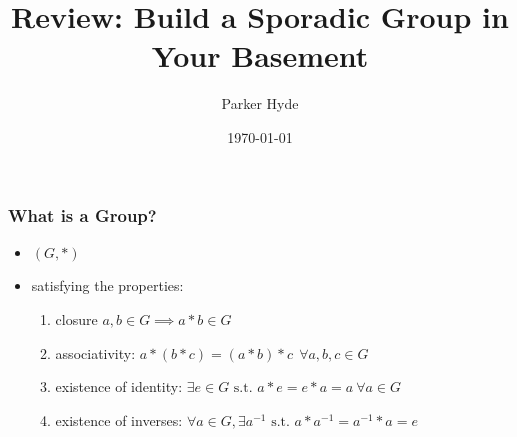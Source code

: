 \documentclass{beamer}
\title{Review: Build a Sporadic Group in Your Basement}
\author{Parker Hyde}
\institute{Georgia State University}
\date{\today}
\begin{document}
\frame{\titlepage}

\begin{frame}
    \frametitle{What is a Group?}
    \begin{itemize}
        \item<2-> \( (G, *) \)
        \item<3->satisfying the properties:
            \begin{enumerate}
                \item closure \( a, b \in G \implies a * b \in G \)
                \item associativity: \(  a * (b * c) = (a * b) * c \ \ \forall a,b,c \in G \) 
                \item existence of identity: \( \exists e \in G \text{ s.t. } a*e = e*a = a \ \forall a \in G \) 
                \item existence of inverses: \( \forall a \in G,  \exists a^{-1} \text { s.t. } a * a^{-1} = a^{-1} * a = e\) 
            \end{enumerate}
    \end{itemize}
\end{frame}
\newtheorem{exmp}{Example}
\end{document}
